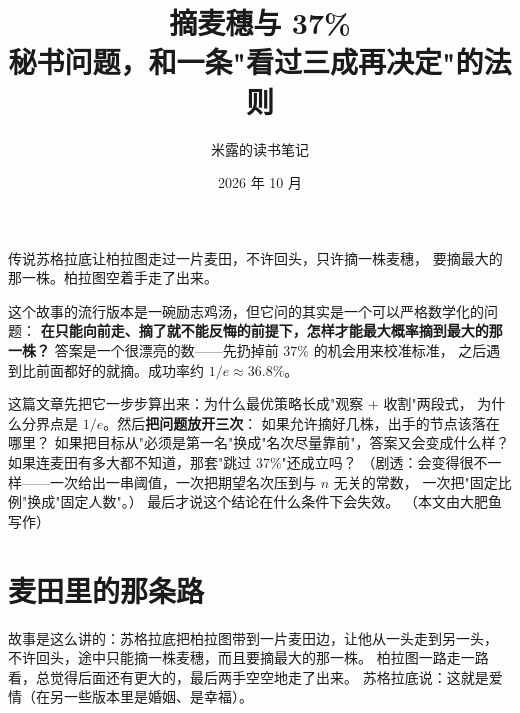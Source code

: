 \documentclass[UTF8,11pt,fontset=macnew]{ctexart}
\title{\bfseries 摘麦穗与 37\%\\[0.35em]
  \large 秘书问题，和一条"看过三成再决定"的法则}
\author{米露的读书笔记}
\date{2026 年 10 月}
\begin{document}
\maketitle
\pagestyle{plain}
\thispagestyle{empty}

\begin{keybox}[这篇文章想做的事]
传说苏格拉底让柏拉图走过一片麦田，不许回头，只许摘一株麦穗，
要摘最大的那一株。柏拉图空着手走了出来。

这个故事的流行版本是一碗励志鸡汤，但它问的其实是一个可以严格数学化的问题：
\textbf{在只能向前走、摘了就不能反悔的前提下，怎样才能最大概率摘到最大的那一株？}
答案是一个很漂亮的数——先扔掉前 $37\%$ 的机会用来校准标准，
之后遇到比前面都好的就摘。成功率约 $1/e\approx36.8\%$。

这篇文章先把它一步步算出来：为什么最优策略长成"观察 + 收割"两段式，
为什么分界点是 $1/e$。然后\textbf{把问题放开三次}：
如果允许摘好几株，出手的节点该落在哪里？
如果把目标从"必须是第一名"换成"名次尽量靠前"，答案又会变成什么样？
如果连麦田有多大都不知道，那套"跳过 $37\%$"还成立吗？
（剧透：会变得很不一样——一次给出一串阈值，一次把期望名次压到与 $n$ 无关的常数，
一次把"固定比例"换成"固定人数"。）
最后才说这个结论在什么条件下会失效。
（本文由大肥鱼写作）
\end{keybox}

\section{麦田里的那条路}

\begin{center}
\end{center}

故事是这么讲的：苏格拉底把柏拉图带到一片麦田边，让他从一头走到另一头，
不许回头，途中只能摘一株麦穗，而且要摘最大的那一株。
柏拉图一路走一路看，总觉得后面还有更大的，最后两手空空地走了出来。
苏格拉底说：这就是爱情（在另一些版本里是婚姻、是幸福）。
\end{document}
